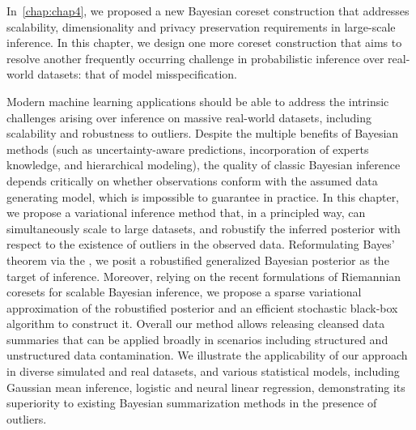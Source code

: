 {
	In~\cref{chap:chap4}, we proposed a new Bayesian coreset construction that addresses scalability, dimensionality and privacy preservation requirements in large-scale inference. In this chapter, we design one more coreset construction that aims to resolve another frequently occurring challenge in probabilistic inference over real-world datasets: that of model misspecification.
	
	Modern machine learning applications should be able to address the intrinsic challenges arising over inference on massive real-world datasets, including scalability and robustness to outliers. Despite the multiple benefits of Bayesian methods (such as uncertainty-aware predictions, incorporation of experts knowledge, and hierarchical modeling), the quality of classic Bayesian inference depends critically on whether observations conform with the assumed data generating model, which is impossible to guarantee in practice. In this chapter, we propose a variational inference method that, in a principled way, can simultaneously scale to large datasets, and robustify the inferred posterior with respect to the existence of outliers in the observed data. Reformulating Bayes' theorem via the \bdiv, we posit a robustified generalized Bayesian posterior as the target of inference. Moreover, relying on the recent formulations of Riemannian coresets for scalable Bayesian inference, we propose a sparse variational approximation of the robustified posterior and an efficient stochastic black-box algorithm to construct it. Overall our method allows releasing cleansed data summaries  that can be applied broadly in scenarios including structured and unstructured data contamination. We illustrate the applicability of our approach in diverse simulated and real datasets, and various statistical models, including Gaussian mean inference, logistic and neural linear regression, demonstrating its superiority to existing Bayesian summarization methods in the presence of outliers. %
}

